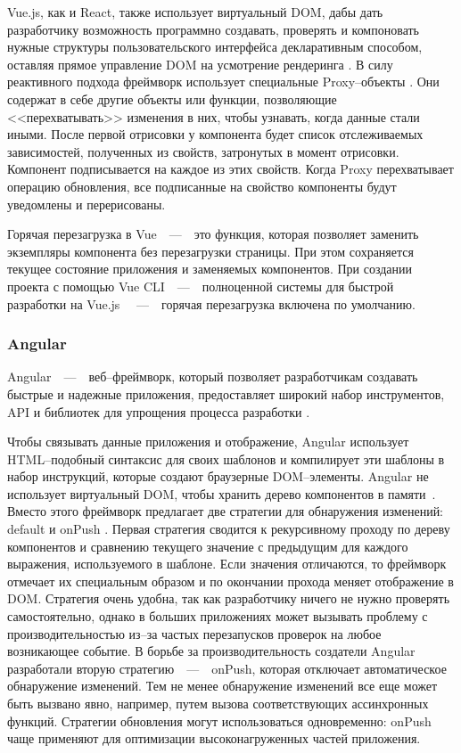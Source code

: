 Vue.js, как и React, также использует виртуальный DOM, дабы дать разработчику возможность программно создавать, проверять и компоновать нужные структуры пользовательского интерфейса декларативным способом, оставляя прямое управление DOM на усмотрение рендеринга \cite{vue-render}.
В силу реактивного подхода фреймворк использует специальные Proxy--объекты \cite{vue-proxy}. Они содержат в себе другие объекты или функции, позволяющие <<перехватывать>> изменения в них, чтобы узнавать, когда данные стали иными.
После первой отрисовки у компонента будет список отслеживаемых зависимостей, полученных из свойств, затронутых в момент отрисовки. 
Компонент подписывается на каждое из этих свойств.
Когда Proxy перехватывает операцию обновления, все подписанные на свойство компоненты будут уведомлены и перерисованы.

Горячая перезагрузка в Vue~~---~~это функция, которая позволяет заменить экземпляры компонента без перезагрузки страницы. 
При этом сохраняется текущее состояние приложения и заменяемых компонентов.
При создании проекта с помощью Vue CLI~~---~~полноценной системы для быстрой разработки на Vue.js \cite{vue-cli}~~---~~горячая перезагрузка включена по умолчанию. 


\subsubsection{Angular}

Angular~~---~~веб--фреймворк, который позволяет разработчикам создавать быстрые и надежные приложения, предоставляет широкий набор инструментов, API и библиотек для упрощения процесса разработки \cite{angular}. 

Чтобы связывать данные приложения и отображение,  Angular использует HTML--подобный синтаксис для своих шаблонов и компилирует эти шаблоны в набор инструкций, которые создают браузерные DOM--элементы. 
Angular не использует виртуальный DOM, чтобы хранить дерево компонентов в памяти~\cite{angular-dom}.
Вместо этого фреймворк предлагает две стратегии для обнаружения изменений: default и onPush \cite{angular-strategy}.
Первая стратегия сводится к рекурсивному проходу по дереву компонентов и сравнению текущего значение с предыдущим для каждого выражения, используемого в шаблоне. 
Если значения отличаются, то фреймворк отмечает их специальным образом и по окончании прохода меняет отображение в DOM.
Стратегия очень удобна, так как разработчику ничего не нужно проверять самостоятельно, однако в больших приложениях может вызывать проблему с производительностью из--за частых перезапусков проверок на любое возникающее событие. 
В борьбе за производительность создатели Angular разработали вторую стратегию~~---~~onPush, которая отключает автоматическое обнаружение изменений.
Тем не менее обнаружение изменений все еще может быть вызвано явно, например, путем вызова соответствующих ассинхронных функций.
Стратегии обновления могут использоваться одновременно: onPush чаще применяют для оптимизации высоконагруженных частей приложения.

